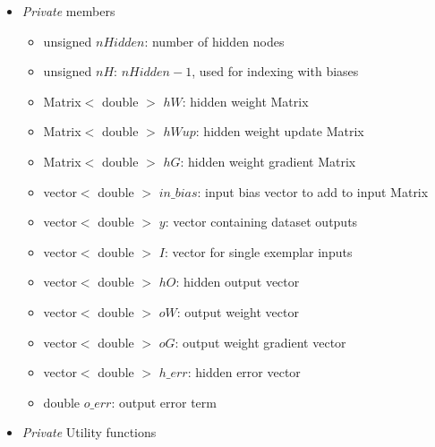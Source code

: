 \documentclass{report}
\begin{document}
\begin{itemize}
\begin{itemize}
      virtual method inherited from {\em Network} which is called by
      trainSet() to calculate the gradient and return set error, used
      for automatic stepsize selection
\item virtual void forward( Matrix$<$ double $>$\& $M$, unsigned $n$
      ): Implementation of the pure virtual method inherited from {\em
      Network} which forward propagates for one input row $n$ in a
      Matrix of inputs $M$ (e.g. either the inherited {\em Model}
      Matrix $Train$ or $Test$)
\item virtual void removeInputs( vector$<$ unsigned $>$\&
      $v$ ): Implementation of the pure virtual method which takes as
      its argument a vector of unsigned $v$ representing positions of
      input nodes, and removes those nodes from the {\em SimpleProp}
      object
\end{itemize}

\item {\em Private} members

\begin{itemize}
\item unsigned $nHidden$: number of hidden nodes
\item unsigned $nH$: $nHidden - 1$, used for indexing with biases
\item Matrix$<$ double $>$ $hW$: hidden weight Matrix
\item Matrix$<$ double $>$ $hWup$: hidden weight update Matrix
\item Matrix$<$ double $>$ $hG$: hidden weight gradient Matrix
\item vector$<$ double $>$ $in\_bias$: input bias vector to add to
      input Matrix
\item vector$<$ double $>$ $y$: vector containing dataset outputs
\item vector$<$ double $>$ $I$: vector for single exemplar inputs
\item vector$<$ double $>$ $hO$: hidden output vector
\item vector$<$ double $>$ $oW$: output weight vector
\item vector$<$ double $>$ $oG$: output weight gradient vector
\item vector$<$ double $>$ $h\_err$: hidden error vector
\item double $o\_err$: output error term
\end{itemize}

\item {\em Private} Utility functions


\end{itemize}
\end{document}

